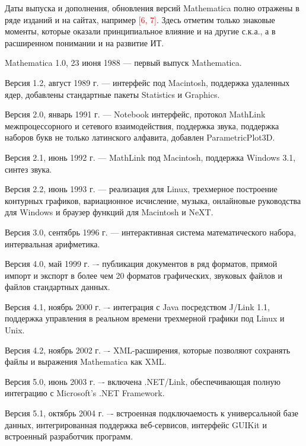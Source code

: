 Даты выпуска и дополнения, обновления версий Mathematica полно отражены в ряде изданий и на сайтах, например \textcolor{red}{[6, 7]}. 
Здесь отметим только знаковые моменты, которые оказали принципиальное влияние и на другие с.к.а., а в расширенном понимании и на развитие ИТ.
\begin{textitemize}
	\item Mathematica 1.0, 23 июня 1988 --- первый выпуск Mathematica.
	\item Версия 1.2, август 1989 г. --- интерфейс под Macintosh, поддержка удаленных ядер, добавлены стандартные пакеты Statistics и Graphics.
	\item Версия 2.0, январь 1991 г. --- Notebook интерфейс, протокол MathLink межпроцессорного и сетевого взаимодействия, поддержка звука, поддержка наборов букв не только латинского алфавита, добавлен ParametricPlot3D.
	\item Версия 2.1, июнь 1992 г. --- MathLink под Macintosh, поддержка Windows 3.1, синтез звука.
	\item Версия 2.2, июнь 1993 г. --- реализация для Linux, трехмерное построение контурных графиков, вариационное исчисление, музыка, онлайновые руководства для Windows и браузер функций для Macintosh и NeXT.
	\item Версия 3.0, сентябрь 1996 г. --- интерактивная система математического набора, интервальная арифметика.
	\item Версия 4.0, май 1999 г. –- публикация документов в ряд форматов, прямой импорт и экспорт в более чем 20 форматов графических, звуковых файлов и файлов стандартных данных.
	\item Версия 4.1, ноябрь 2000 г. –- интеграция с Java посредством J/Link 1.1, поддержка управления в реальном времени трехмерной графики под Linux и Unix.
	\item Версия 4.2, ноябрь 2002 г. –- XML-расширения, которые позволяют сохранять файлы и выражения Mathematica как XML.
	\item Версия 5.0, июнь 2003 г. –- включена .NET/Link, обеспечивающая полную интеграцию с Microsoft’s .NET Framework.
	\item Версия 5.1, октябрь 2004 г. –- встроенная подключаемость к универсальной базе данных, интегрированная поддержка веб-сервисов, интерфейс GUIKit и встроенный разработчик программ.

\end{textitemize}
